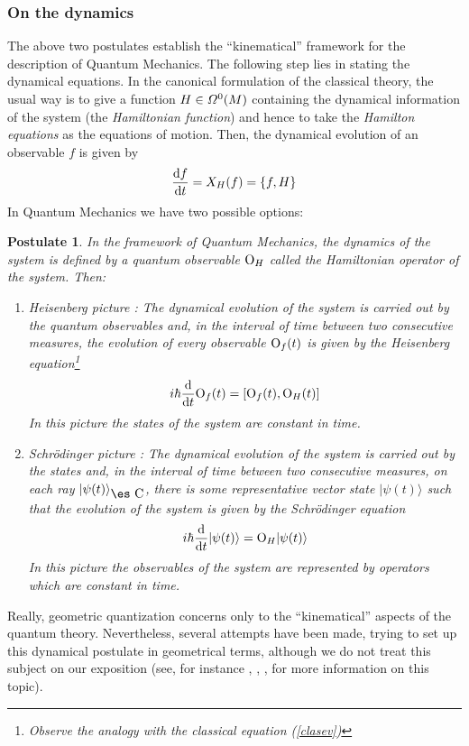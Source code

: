 \documentclass[12pt]{article}
\newtheorem{post}{Postulate}
\def\beq{\begin{equation}}
\def\eeq{\end{equation}}
\def\d{{\rm d}}
\def\Op{{\rm O}}
\def\Complex{\mbox{\es C}}
\begin{document}
\subsubsection{On the dynamics}


The above two postulates establish the ``kinematical'' framework
for the description of Quantum Mechanics.
The following step lies in stating the dynamical equations.
In the canonical formulation of the classical theory,
the usual way is to give a function $H \in {\mit\Omega}^0(M)$
containing the dynamical information of the system
(the {\it Hamiltonian function}) and hence to take the
{\it Hamilton equations} as the equations of motion.
Then, the dynamical evolution of an observable $f$ is given by
\beq
\frac{\d f}{\d t} = X_H(f) = \{ f,H \}
\label{clasev}
\eeq
In Quantum Mechanics we have two possible options:

\begin{post}
In the framework of Quantum Mechanics, the dynamics of the system is
defined
by a quantum observable $\Op_H$ called the
{\it Hamiltonian operator} of the system. Then:
\begin{enumerate}
\item
{\rm Heisenberg picture \/}:
The dynamical evolution of the system is carried out by the quantum
observables and,
in the interval of time between two consecutive measures,
the evolution of every observable $\Op_f(t)$  is given by the
{\rm Heisenberg equation}\footnote{
Observe the analogy with the classical equation
(\ref{clasev})}
$$
i\hbar\frac{\d}{\d t}{\Op_f(t)} = [\Op_f(t),\Op_H(t)]
$$
In this picture the states of the system are constant in time.
\item
{\rm Schr\"odinger picture \/}:
The dynamical evolution of the system is carried out by the states and,
in the interval of time between two consecutive measures, on each ray
$|\psi (t) \rangle_{\Complex}$, there is some representative vector
state
$|\psi (t) \rangle $ such that the evolution of the system is given by
the
{\rm Schr\"{o}dinger equation}
$$
i\hbar\frac{\d}{\d t}|\psi (t) \rangle = \Op_H|\psi (t) \rangle
$$
In this picture the observables of the system are  represented
by operators which are constant in time.
\end{enumerate}
\label{pos5}
\end{post}

Really, geometric quantization concerns only to the ``kinematical''
aspects of the quantum theory. Nevertheless, several
attempts have been made, trying to set up this dynamical postulate in
geometrical terms,
although we do not treat this subject on our exposition
(see, for instance \cite{ACP-82}, \cite{Il-98a}, \cite{Il-98b},
\cite{Tu-85}
for more information on this topic).
\end{document}
